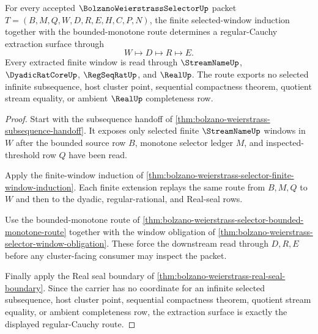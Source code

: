 \begin{theorem}
\label{thm:bolzano-weierstrass-selector-regular-cauchy-extraction-route}
For every accepted $\BolzanoWeierstrassSelectorUp$ packet $T=(B,M,Q,W,D,R,E,H,C,P,N)$, the finite selected-window induction together with the bounded-monotone route determines a regular-Cauchy extraction surface through
$$
W \longmapsto D \longmapsto R \longmapsto E .
$$
Every extracted finite window is read through $\StreamNameUp$, $\DyadicRatCoreUp$, $\RegSeqRatUp$, and $\RealUp$. The route exports no selected infinite subsequence, host cluster point, sequential compactness theorem, quotient stream equality, or ambient $\RealUp$ completeness row.
\end{theorem}
\begin{proof}
Start with the subsequence handoff of \autoref{thm:bolzano-weierstrass-subsequence-handoff}. It exposes only selected finite $\StreamNameUp$ windows in $W$ after the bounded source row $B$, monotone selector ledger $M$, and inspected-threshold row $Q$ have been read.

Apply the finite-window induction of \autoref{thm:bolzano-weierstrass-selector-finite-window-induction}. Each finite extension replays the same route from $B,M,Q$ to $W$ and then to the dyadic, regular-rational, and Real-seal rows.

Use the bounded-monotone route of \autoref{thm:bolzano-weierstrass-selector-bounded-monotone-route} together with the window obligation of \autoref{thm:bolzano-weierstrass-selector-window-obligation}. These force the downstream read through $D,R,E$ before any cluster-facing consumer may inspect the packet.

Finally apply the Real seal boundary of \autoref{thm:bolzano-weierstrass-real-seal-boundary}. Since the carrier has no coordinate for an infinite selected subsequence, host cluster point, sequential compactness theorem, quotient stream equality, or ambient completeness row, the extraction surface is exactly the displayed regular-Cauchy route.
\end{proof}

